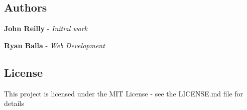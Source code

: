 \subsection*{Authors}


\begin{DoxyItemize}
\item {\bfseries John Reilly} -\/ {\itshape Initial work}
\item {\bfseries Ryan Balla} -\/ {\itshape Web Development}
\end{DoxyItemize}

\subsection*{License}

This project is licensed under the M\+IT License -\/ see the L\+I\+C\+E\+N\+SE.md file for details 